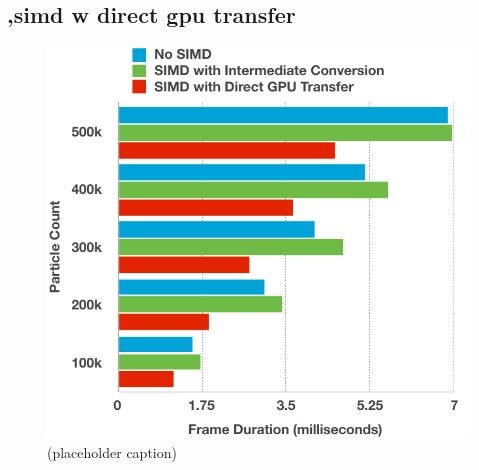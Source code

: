 \documentclass[11pt, a4paper, twocolumn]{article}
\begin{document}
\subsection{,simd w direct gpu transfer}

\lipsum[1-1]

\begin{figure}[h]
\includegraphics[width=\linewidth]{nosimd-simdwic-simdwdirect}
\caption{(placeholder caption)}
\label{fig:nosimd-simdwic-simdwdirect}
\end{figure}


\end{document}

